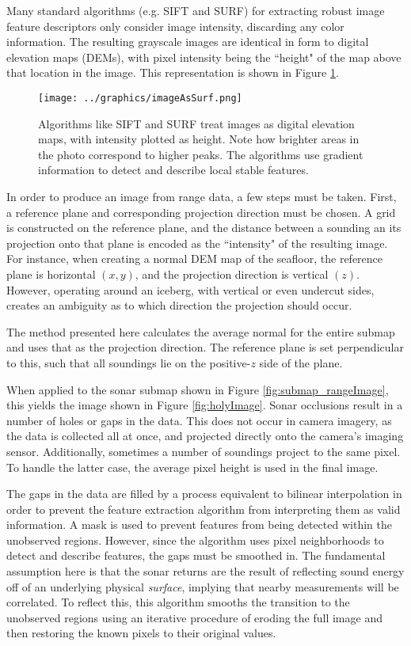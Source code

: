 Many standard algorithms (e.g. SIFT and SURF) for extracting robust image feature descriptors only consider image intensity, discarding any color information. The resulting grayscale images are identical in form to digital elevation maps (DEMs), with pixel intensity being the ``height" of the map above that location in the image. This representation is shown in Figure \ref{fig:imAsSurf}. 

\begin{figure}[htb]
   \centering
   \texttt{[image: ../graphics/imageAsSurf.png]} %
   \caption{Algorithms like SIFT and SURF treat images as digital elevation maps, with intensity plotted as height. Note how brighter areas in the photo correspond to higher peaks. The algorithms use gradient information to detect and describe local stable features.}
   \label{fig:imAsSurf}
\end{figure}

In order to produce an image from range data, a few steps must be taken. First, a reference plane and corresponding projection direction must be chosen. A grid is constructed on the reference plane, and the distance between a sounding an its projection onto that plane is encoded as the ``intensity" of the resulting image. For instance, when creating a normal DEM map of the seafloor, the reference plane is horizontal $(x,y)$, and the projection direction is vertical $(z)$. However, operating around an iceberg, with vertical or even undercut sides, creates an ambiguity as to which direction the projection should occur. 

The method presented here calculates the average normal for the entire submap and uses that as the projection direction. The reference plane is set perpendicular to this, such that all soundings lie on the positive-$z$ side of the plane.

When applied to the sonar submap shown in Figure \ref{fig:submap_rangeImage}, this yields the image shown in Figure \ref{fig:holyImage}. Sonar occlusions result in a number of holes or gaps in the data. This does not occur in camera imagery, as the data is collected  all at once, and projected directly onto the camera's imaging sensor. Additionally, sometimes a number of soundings project to the same pixel. To handle the latter case, the average pixel height is used in the final image. 

The gaps in the data are filled by a process equivalent to bilinear interpolation in order to prevent the feature extraction algorithm from interpreting them as valid information. A mask is used to prevent features from being detected within the unobserved regions. However, since the algorithm uses pixel neighborhoods to detect and describe features, the gaps must be smoothed in. The fundamental assumption here is that the sonar returns are the result of reflecting sound energy off of an underlying physical \emph{surface}, implying that nearby measurements will be correlated.  To reflect this, this algorithm smooths the transition to the unobserved regions using an iterative procedure of eroding the full image and then restoring the known pixels to their original values.

